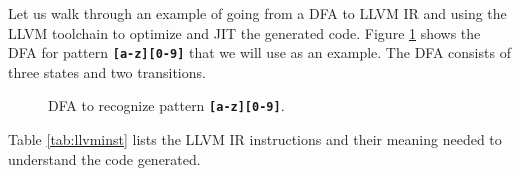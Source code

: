 Let us walk through an example of going from a DFA to LLVM IR and using the LLVM toolchain to optimize and JIT the generated code. Figure \ref{fig:dfacodegenex} shows the DFA for pattern \texttt{\textbf{[a-z][0-9]}} that we will use as an example. The DFA consists of three states and two transitions.

\begin{figure}[H]
\centering
{}
\caption{DFA to recognize pattern \texttt{\textbf{[a-z][0-9]}}.}\label{fig:dfacodegenex}
\end{figure}

Table \ref{tab:llvminst} lists the LLVM IR instructions and their meaning needed to understand the code generated.

